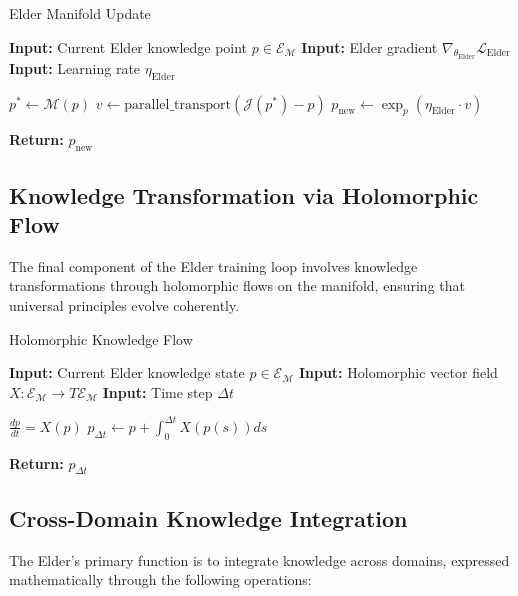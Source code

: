 \begin{algorithm}
\caption{Elder Manifold Update}
\begin{algorithmic}[1]
\State \textbf{Input:} Current Elder knowledge point $p \in \mathcal{E}_{\mathcal{M}}$
\State \textbf{Input:} Elder gradient $\nabla_{\theta_{\text{Elder}}} \mathcal{L}_{\text{Elder}}$
\State \textbf{Input:} Learning rate $\eta_{\text{Elder}}$

\State $p^* \gets \mathcal{M}(p)$ 
\State $v \gets \text{parallel\_transport}(\mathcal{J}(p^*) - p)$ 
\State $p_{\text{new}} \gets \exp_p(\eta_{\text{Elder}} \cdot v)$ 

\State \textbf{Return:} $p_{\text{new}}$
\end{algorithmic}
\end{algorithm}

\subsection{Knowledge Transformation via Holomorphic Flow}

The final component of the Elder training loop involves knowledge transformations through holomorphic flows on the manifold, ensuring that universal principles evolve coherently.

\begin{algorithm}
\caption{Holomorphic Knowledge Flow}
\begin{algorithmic}[1]
\State \textbf{Input:} Current Elder knowledge state $p \in \mathcal{E}_{\mathcal{M}}$
\State \textbf{Input:} Holomorphic vector field $X: \mathcal{E}_{\mathcal{M}} \rightarrow T\mathcal{E}_{\mathcal{M}}$
\State \textbf{Input:} Time step $\Delta t$

\State $\frac{dp}{dt} = X(p)$ 
\State $p_{\Delta t} \gets p + \int_0^{\Delta t} X(p(s)) ds$ 

\State \textbf{Return:} $p_{\Delta t}$
\end{algorithmic}
\end{algorithm}

\subsection{Cross-Domain Knowledge Integration}

The Elder's primary function is to integrate knowledge across domains, expressed mathematically through the following operations:

